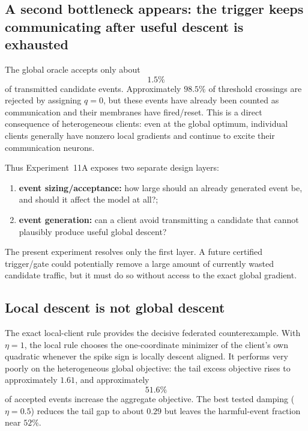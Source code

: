 \subsection{A second bottleneck appears: the trigger keeps communicating after useful descent is exhausted}

The global oracle accepts only about
\begin{equation}
  \boxed{1.5\%}
\end{equation}
of transmitted candidate events. Approximately $98.5\%$ of threshold crossings are rejected by assigning $q=0$, but these events have already been counted as communication and their membranes have fired/reset. This is a direct consequence of heterogeneous clients: even at the global optimum, individual clients generally have nonzero local gradients and continue to excite their communication neurons.

Thus Experiment~11A exposes two separate design layers:
\begin{enumerate}
  \item \textbf{event sizing/acceptance:} how large should an already generated event be, and should it affect the model at all?;
  \item \textbf{event generation:} can a client avoid transmitting a candidate that cannot plausibly produce useful global descent?
\end{enumerate}
The present experiment resolves only the first layer. A future certified trigger/gate could potentially remove a large amount of currently wasted candidate traffic, but it must do so without access to the exact global gradient.

\subsection{Local descent is not global descent}

The exact local-client rule provides the decisive federated counterexample. With $\eta=1$, the local rule chooses the one-coordinate minimizer of the client's own quadratic whenever the spike sign is locally descent aligned. It performs very poorly on the heterogeneous global objective: the tail excess objective rises to approximately $1.61$, and approximately
\begin{equation}
  \boxed{51.6\%}
\end{equation}
of accepted events increase the aggregate objective. The best tested damping ($\eta=0.5$) reduces the tail gap to about $0.29$ but leaves the harmful-event fraction near $52\%$.

